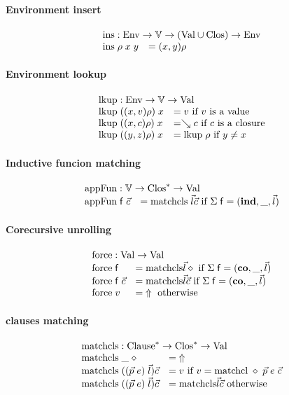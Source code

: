 \paragraph*{Environment insert}  
\[
\begin{array}{ll}
\multicolumn{2}{l}{\ins : \Env \ra \cV \ra ( \Val \cup \Clos ) \ra \Env}\\
\ins \; \rho \; x \; y & = (x,y) \rho
\end{array}
\]

\paragraph*{Environment lookup}
\[
\begin{array}{ll}
\multicolumn{2}{l}{\lkup : \Env \ra \cV \ra \Val }\\
\lkup \; ((x,v) \rho) \; x & = v \mbox{ if } v \mbox{ is a value} \\
\lkup \; ((x,c) \rho) \; x & = \wh c \mbox{ if } c \mbox{ is a closure} \\
\lkup \; ((y,z) \rho) \; x & = \lkup \; \rho \mbox{ if } y \neq x  
\end{array}
\]

\paragraph*{Inductive funcion matching}
\[
\begin{array}{ll}
\multicolumn{2}{l}{\apf : \cV \ra \ves{\Clos} \ra \Val}\\
\apf \; \ff \; \vec{c} & = \matchcls \; \vec{l} \vec{c} \mbox{ if } \Sig \; \ff = (\ind,\_,\vec{l}) 
\end{array}
\]

\paragraph*{Corecursive unrolling}
\[
\begin{array}{ll}
\multicolumn{2}{l}{\forc : \Val \ra \Val }\\
\forc \; \ff & = \matchcls \vec{l} \diamond \mbox{ if } \Sig \; \ff = (\co,\_,\vec{l})  \\
\forc \; \ff \; \vec{c} & = \matchcls \vec{l} \vec{c} \mbox{ if } \Sig \; \ff = (\co,\_,\vec{l})\\ 
\forc \; v & = \stuck \mbox{ otherwise}
\end{array}
\]

\paragraph*{clauses matching}
\[
\begin{array}{ll}
\multicolumn{2}{l}{\matchcls : \ves{\Clause} \ra \ves{\Clos} \ra \Val}\\
\matchcls \; \_ \; \diamond & = \stuck \\
\matchcls \;  ((\vec{p} \; e)\;\vec{l}) \vec{c} & = v \mbox{ if } v = \matchcl \; \diamond \; \vec{p} \; e \;  \vec{c} \\
\matchcls \; ((\vec{p} \; e)\;\vec{l}) \vec{c} & = \matchcls \vec{l} \vec{c} \mbox{ otherwise}  
\end{array}
\]

